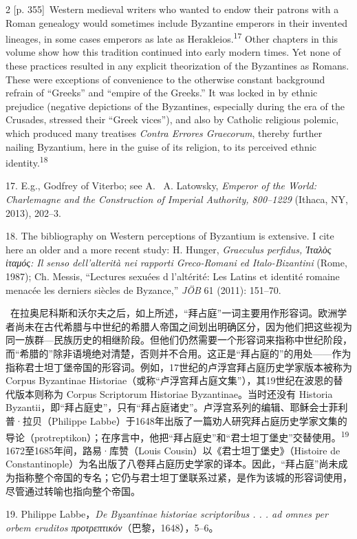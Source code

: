 \documentclass[10pt,a4paper]{article}
\begin{document}
\begin{paracol}{2}
\switchcolumn
{\scriptsize\color{gray}[p. 355]}\ Western medieval writers who wanted to endow their patrons with a Roman genealogy would sometimes include Byzantine emperors in their invented lineages, in some cases emperors as late as Herakleios.\nobreak\textsuperscript{17} Other chapters in this volume show how this tradition continued into early modern times. Yet none of these practices resulted in any explicit theorization of the Byzantines as Romans. These were exceptions of convenience to the otherwise constant background refrain of “Greeks” and “empire of the Greeks.” It was locked in by ethnic prejudice (negative depictions of the Byzantines, especially during the era of the Crusades, stressed their “Greek vices”), and also by Catholic religious polemic, which produced many treatises \textit{Contra Errores Graecorum}, thereby further nailing Byzantium, here in the guise of its religion, to its perceived ethnic identity.\nobreak\textsuperscript{18}\par{\small 17.  E.g., Godfrey of Viterbo; see A.  A. Latowsky, \textit{Emperor of the World: Charlemagne and the Construction of Imperial Authority, 800–1229} (Ithaca, NY, 2013), 202–3.\par}{\small 18.  The bibliography on Western perceptions of Byzantium is extensive. I cite here an older and a more recent study: H. Hunger, \textit{Graeculus perfidus, Ἰταλὸς ἰταμός: Il senso dell’alterità nei rapporti Greco-Romani ed Italo-Bizantini} (Rome, 1987); Ch. Messis, “Lectures sexuées d l’altérité: Les Latins et identité romaine menacée les derniers siècles de Byzance,”\textit{ JÖB} 61 (2011): 151–70.\par}
\switchcolumn*
{\scriptsize\color{gray}[p. 355–356]}\ 在拉奥尼科斯和沃尔夫之后，如上所述，“拜占庭”一词主要用作形容词。欧洲学者尚未在古代希腊与中世纪的希腊人帝国之间划出明确区分，因为他们把这些视为同一族群—民族历史的相继阶段。但他们仍然需要一个形容词来指称中世纪阶段，而“希腊的”除非语境绝对清楚，否则并不合用。这正是“拜占庭的”的用处——作为指称君士坦丁堡帝国的形容词。例如，17世纪的卢浮宫拜占庭历史学家版本被称为 Corpus Byzantinae Historiae（或称“卢浮宫拜占庭文集”），其19世纪在波恩的替代版本则称为 Corpus Scriptorum Historiae Byzantinae。当时还没有 Historia Byzantii，即“拜占庭史”，只有“拜占庭诸史”。卢浮宫系列的编辑、耶稣会士菲利普·拉贝（Philippe Labbe）于1648年出版了一篇劝人研究拜占庭历史学家文集的导论（protreptikon）；在序言中，他把“拜占庭史”和“君士坦丁堡史”交替使用。\nobreak\textsuperscript{19} 1672至1685年间，路易·库赞（Louis Cousin）以《君士坦丁堡史》（Histoire de Constantinople）为名出版了八卷拜占庭历史学家的译本。因此，“拜占庭”尚未成为指称整个帝国的专名；它仍与君士坦丁堡联系过紧，是作为该城的形容词使用，尽管通过转喻也指向整个帝国。\par{\small 19. Philippe Labbe，\textit{De Byzantinae historiae scriptoribus . . . ad omnes per orbem eruditos προτρεπτικόν}（巴黎，1648），5–6。\par}

\end{paracol}
\end{document}
